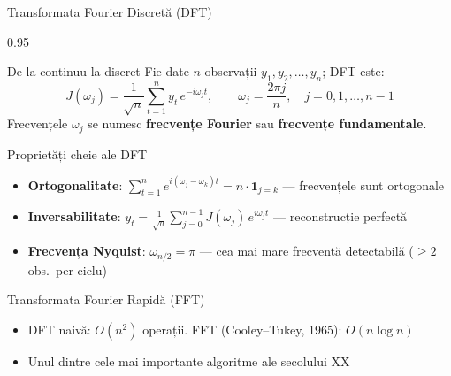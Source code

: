 \documentclass[9pt, aspectratio=169, t]{beamer}
\begin{document}
\begin{frame}{Transformata Fourier Discretă (DFT)}
    \begin{cminipage}{0.95\textwidth}
    \vspace{-2mm}
    \begin{block}{De la continuu la discret}
        {\small Fie date $n$ observații $y_1, y_2, \ldots, y_n$; DFT este:
        \[
            J(\omega_j) = \frac{1}{\sqrt{n}} \sum_{t=1}^{n} y_t \, e^{-i\omega_j t}, \qquad \omega_j = \frac{2\pi j}{n}, \quad j = 0, 1, \ldots, n-1
        \]
        Frecvențele $\omega_j$ se numesc \textbf{frecvențe Fourier} sau \textbf{frecvențe fundamentale}.}
    \end{block}
    \vspace{-2mm}
    \begin{alertblock}{Proprietăți cheie ale DFT}
        \begin{itemize}\setlength{\itemsep}{0pt}
            \item \textbf{Ortogonalitate}: $\sum_{t=1}^n e^{i(\omega_j - \omega_k)t} = n \cdot \mathbf{1}_{j=k}$ --- frecvențele sunt ortogonale
            \item \textbf{Inversabilitate}: $y_t = \frac{1}{\sqrt{n}} \sum_{j=0}^{n-1} J(\omega_j) \, e^{i\omega_j t}$ --- reconstrucție perfectă
            \item \textbf{Frecvența Nyquist}: $\omega_{n/2} = \pi$ --- cea mai mare frecvență detectabilă ($\geq 2$ obs.\ per ciclu)
        \end{itemize}
    \end{alertblock}
    \vspace{-2mm}
    \begin{exampleblock}{Transformata Fourier Rapidă (FFT)}
        \begin{itemize}\setlength{\itemsep}{0pt}
            \item DFT naivă: $O(n^2)$ operații. FFT (Cooley--Tukey, 1965): $O(n \log n)$
            \item Unul dintre cele mai importante algoritme ale secolului XX
        \end{itemize}
    \end{exampleblock}
    \end{cminipage}
\end{frame}
\end{document}
